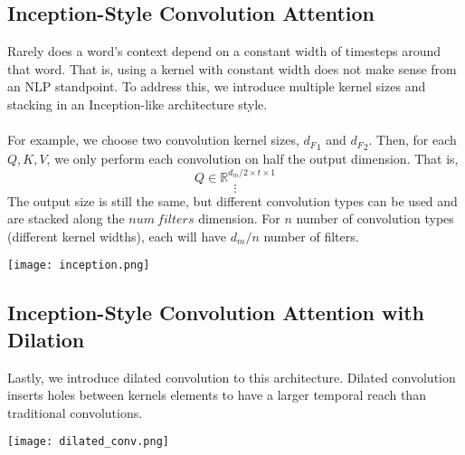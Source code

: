 \documentclass{article}
\begin{document}
	\subsection{Inception-Style Convolution Attention}
	Rarely does a word's context depend on a constant width of timesteps around that word.  That is, using a kernel with constant width does not make sense from an NLP standpoint.  To address this, we introduce multiple kernel sizes and stacking in an Inception-like architecture style.
	\\~\\
	For example, we choose two convolution kernel sizes, \({d_F}_1\) and \({d_F}_2\).  Then, for each \(Q, K, V\), we only perform each convolution on half the output dimension.  That is,
	\[Q \in \mathbb{R}^{d_m/2 \times t \times 1}\]
	\[\vdots\]
	The output size is still the same, but different convolution types can be used and are stacked along the \(num\ filters\) dimension.  For \(n\) number of convolution types (different kernel widths), each will have \(d_m/n\) number of filters.
	\begin{center}
		\texttt{[image: inception.png]}
	\end{center}
	
	\subsection{Inception-Style Convolution Attention with Dilation}
	Lastly, we introduce dilated convolution to this architecture.  Dilated convolution inserts holes between kernels elements to have a larger temporal reach than traditional convolutions.
	\begin{center}
		\texttt{[image: dilated\_conv.png]}
	\end{center}
\end{document}
